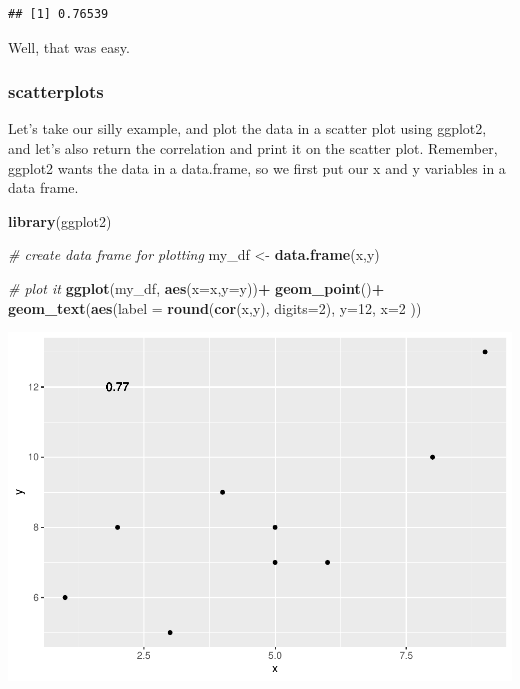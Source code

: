 \documentclass[]{book}
\newenvironment{Shaded}{\begin{snugshade}}{\end{snugshade}}
\newcommand{\KeywordTok}[1]{\textcolor[rgb]{0.13,0.29,0.53}{\textbf{#1}}}
\newcommand{\DataTypeTok}[1]{\textcolor[rgb]{0.13,0.29,0.53}{#1}}
\newcommand{\DecValTok}[1]{\textcolor[rgb]{0.00,0.00,0.81}{#1}}
\newcommand{\StringTok}[1]{\textcolor[rgb]{0.31,0.60,0.02}{#1}}
\newcommand{\CommentTok}[1]{\textcolor[rgb]{0.56,0.35,0.01}{\textit{#1}}}
\newcommand{\OperatorTok}[1]{\textcolor[rgb]{0.81,0.36,0.00}{\textbf{#1}}}
\newcommand{\NormalTok}[1]{#1}
\begin{document}
\begin{verbatim}
## [1] 0.76539
\end{verbatim}

Well, that was easy.

\subsubsection{scatterplots}\label{scatterplots-1}

Let's take our silly example, and plot the data in a scatter plot using
ggplot2, and let's also return the correlation and print it on the
scatter plot. Remember, ggplot2 wants the data in a data.frame, so we
first put our x and y variables in a data frame.

\begin{Shaded}
\begin{Highlighting}[]
\KeywordTok{library}\NormalTok{(ggplot2)}

\CommentTok{# create data frame for plotting}
\NormalTok{my_df <-}\StringTok{ }\KeywordTok{data.frame}\NormalTok{(x,y)}

\CommentTok{# plot it}
\KeywordTok{ggplot}\NormalTok{(my_df, }\KeywordTok{aes}\NormalTok{(}\DataTypeTok{x=}\NormalTok{x,}\DataTypeTok{y=}\NormalTok{y))}\OperatorTok{+}
\StringTok{  }\KeywordTok{geom_point}\NormalTok{()}\OperatorTok{+}
\StringTok{  }\KeywordTok{geom_text}\NormalTok{(}\KeywordTok{aes}\NormalTok{(}\DataTypeTok{label =} \KeywordTok{round}\NormalTok{(}\KeywordTok{cor}\NormalTok{(x,y), }\DataTypeTok{digits=}\DecValTok{2}\NormalTok{), }\DataTypeTok{y=}\DecValTok{12}\NormalTok{, }\DataTypeTok{x=}\DecValTok{2}\NormalTok{ ))}
\end{Highlighting}
\end{Shaded}

\includegraphics{Statistics_Lab_files/figure-latex/unnamed-chunk-66-1.pdf}
\end{document}
